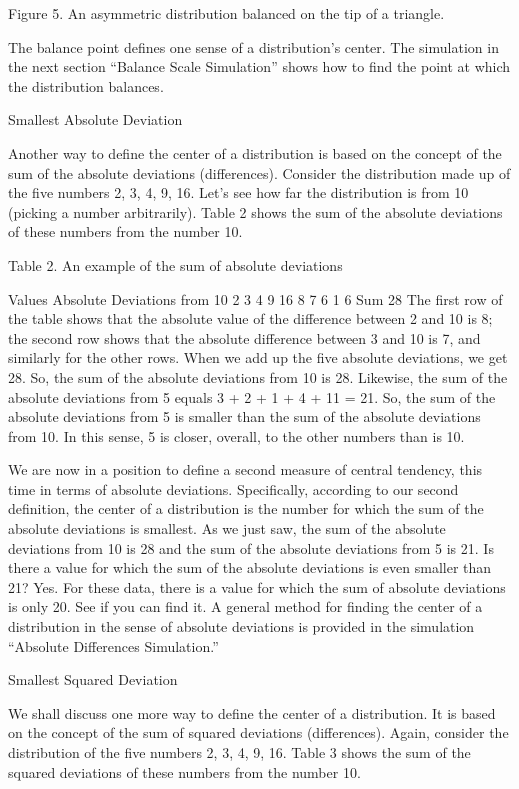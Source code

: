 \documentclass[
]{book}
\begin{document}
Figure 5. An asymmetric distribution balanced on the tip of a triangle.

The balance point defines one sense of a distribution's center. The simulation in the next section ``Balance Scale Simulation'' shows how to find the point at which the distribution balances.

Smallest Absolute Deviation

Another way to define the center of a distribution is based on the concept of the sum of the absolute deviations (differences). Consider the distribution made up of the five numbers 2, 3, 4, 9, 16. Let's see how far the distribution is from 10 (picking a number arbitrarily). Table 2 shows the sum of the absolute deviations of these numbers from the number 10.

Table 2. An example of the sum of absolute deviations

Values Absolute Deviations from 10
2
3
4
9
16 8
7
6
1
6
Sum 28
The first row of the table shows that the absolute value of the difference between 2 and 10 is 8; the second row shows that the absolute difference between 3 and 10 is 7, and similarly for the other rows. When we add up the five absolute deviations, we get 28. So, the sum of the absolute deviations from 10 is 28. Likewise, the sum of the absolute deviations from 5 equals 3 + 2 + 1 + 4 + 11 = 21. So, the sum of the absolute deviations from 5 is smaller than the sum of the absolute deviations from 10. In this sense, 5 is closer, overall, to the other numbers than is 10.

We are now in a position to define a second measure of central tendency, this time in terms of absolute deviations. Specifically, according to our second definition, the center of a distribution is the number for which the sum of the absolute deviations is smallest. As we just saw, the sum of the absolute deviations from 10 is 28 and the sum of the absolute deviations from 5 is 21. Is there a value for which the sum of the absolute deviations is even smaller than 21? Yes. For these data, there is a value for which the sum of absolute deviations is only 20. See if you can find it. A general method for finding the center of a distribution in the sense of absolute deviations is provided in the simulation ``Absolute Differences Simulation.''

Smallest Squared Deviation

We shall discuss one more way to define the center of a distribution. It is based on the concept of the sum of squared deviations (differences). Again, consider the distribution of the five numbers 2, 3, 4, 9, 16. Table 3 shows the sum of the squared deviations of these numbers from the number 10.
\end{document}
